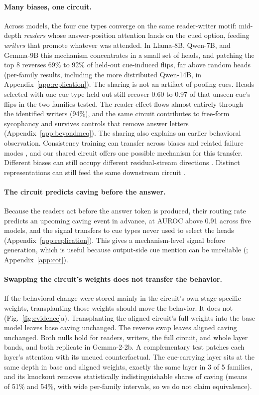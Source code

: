 \documentclass{article}
\begin{document}
\paragraph{Many biases, one circuit.} Across models, the four cue types converge on the same reader-writer motif: mid-depth \emph{readers} whose answer-position attention lands on the cued option, feeding \emph{writers} that promote whatever was attended. In Llama-8B, Qwen-7B, and Gemma-9B this mechanism concentrates in a small set of heads, and patching the top 8 reverses 69\% to 92\% of held-out cue-induced flips, far above random heads (per-family results, including the more distributed Qwen-14B, in Appendix~\ref{app:replication}). The sharing is not an artifact of pooling cues. Heads selected with one cue type held out still recover 0.60 to 0.97 of that unseen cue's flips in the two families tested. The reader effect flows almost entirely through the identified writers (94\%), and the same circuit contributes to free-form sycophancy and survives controls that remove answer letters (Appendix~\ref{app:beyondmcq}). The sharing also explains an earlier behavioral observation. Consistency training can transfer across biases and related failure modes \citep{chua2024bct,gautam2026stack}, and our shared circuit offers one possible mechanism for this transfer. Different biases can still occupy different residual-stream directions \citep{gupta2026directions,gotta2026modes}. Distinct representations can still feed the same downstream circuit \citep{pandey2026sharedcircuit}.

\paragraph{The circuit predicts caving before the answer.} Because the readers act before the answer token is produced, their routing rate predicts an upcoming caving event in advance, at AUROC above 0.91 across five models, and the signal transfers to cue types never used to select the heads (Appendix~\ref{app:replication}). This gives a mechanism-level signal before generation, which is useful because output-side cue mention can be unreliable (\citealp{imran2026ratematching}; Appendix~\ref{app:cot}).

\paragraph{Swapping the circuit's weights does not transfer the behavior.} If the behavioral change were stored mainly in the circuit's own stage-specific weights, transplanting those weights should move the behavior. It does not (Fig.~\ref{fig:evidence}a). Transplanting the aligned circuit's full weights into the base model leaves base caving unchanged. The reverse swap leaves aligned caving unchanged. Both nulls hold for readers, writers, the full circuit, and whole layer bands, and both replicate in Gemma-2-2b. A complementary test patches each layer's attention with its uncued counterfactual. The cue-carrying layer sits at the same depth in base and aligned weights, exactly the same layer in 3 of 5 families, and its knockout removes statistically indistinguishable shares of caving (means of 51\% and 54\%, with wide per-family intervals, so we do not claim equivalence).
\end{document}
